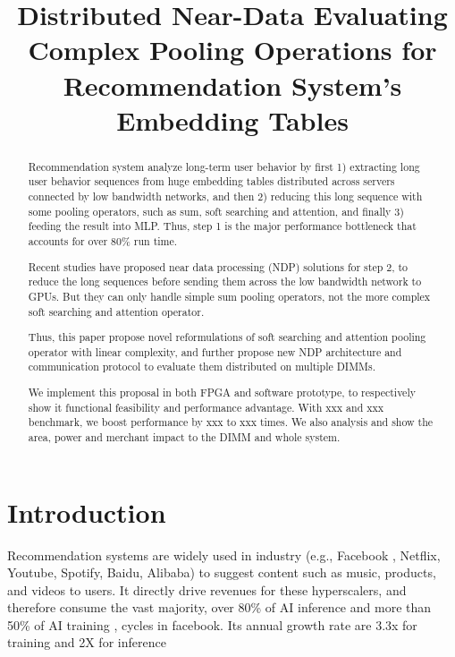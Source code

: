 \documentclass[conference]{IEEEtran}
\title{Distributed Near-Data Evaluating Complex Pooling Operations for Recommendation System's Embedding Tables}
\author{}
\begin{document}
\maketitle
\thispagestyle{firstpage}
\pagestyle{plain}




\begin{abstract}

Recommendation system analyze long-term user behavior by 
first 1) extracting long user behavior sequences from huge embedding tables
distributed across servers connected by low bandwidth networks,
and then 2) reducing this long sequence with some pooling operators,
such as sum, soft searching and attention,
and finally 3) feeding the result into MLP.
Thus,
step 1 is the major performance bottleneck that accounts for over 80\% run time.

Recent studies have proposed near data processing (NDP) 
solutions for step 2, 
to reduce the long sequences before sending them across the low bandwidth network to GPUs.
But they can only handle simple sum pooling operators,
not the more complex soft searching and attention operator.

Thus,
this paper propose novel reformulations of soft searching 
and attention pooling operator with linear complexity,
and further propose new NDP architecture and communication protocol 
to evaluate them distributed on multiple DIMMs.

We implement this proposal in both FPGA and software prototype,
to respectively show it functional feasibility and performance advantage.
With xxx and xxx  benchmark,
we boost performance by xxx to xxx times.
We also analysis and show the area, power and merchant impact to the DIMM and whole system.
\end{abstract}

\section{Introduction}

Recommendation systems are widely used in
industry (e.g., 
Facebook \cite{recsys_dlrm_facebook}, 
Netflix\cite{recsys_netflix}, 
Youtube\cite{recsys_youtube}, 
Spotify\cite{recsys_spotify}, 
Baidu\cite{recsys_mobius_baidu},
Alibaba\cite{recsys_sim_alibaba}) 
to suggest content such as music, products, and videos to users. 
It directly drive revenues for these hyperscalers,
and therefore consume the vast majority,
over 80\% of AI inference \cite{ recsys_archimp_facebook_hpca20 } and more than 50\% of AI training \cite{ recsys_trainfb_facebook } ,
cycles in facebook.
Its annual growth rate are 3.3x for training \cite{recsys_trainfb_facebook} and 2X for inference \cite{recsys_inffb_facebook}
\end{document}
